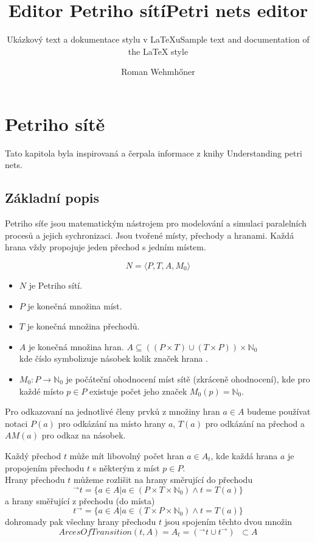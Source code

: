 \documentclass[
  biblatex,
  glossaries,
]{kidiplom}
\title{Editor Petriho sítí}
\title[english]{Petri nets editor}
\subtitle{Ukázkový text a dokumentace stylu v \LaTeX{}u}
\subtitle[english]{Sample text and documentation of the \LaTeX{} style}
\author{Roman Wehmhőner}
\begin{document}
\maketitle

\newcommand{\BibLaTeX}{\textsc{Bib}\LaTeX}
\newcommand{\todo}[1]{\textcolor{red}{TODO: #1}\PackageWarning{TODO:}{#1!}}



\section{Petriho sítě}
Tato kapitola byla inspirovaná a čerpala informace z knihy 
Understanding petri nets\cite{reisig2013understanding}.


\subsection{Základní popis}

Petriho síťe jsou matematickým nástrojem
pro modelování a simulaci paralelních procesů a jejich sychronizaci.
Jsou tvořené místy, přechody a hranami. Každá hrana vždy propojuje
jeden přechod s jedním místem.

\begin{definition}
  $$ N = \langle P,T,A,M_{0}\rangle $$
  \begin{itemize}
    \item $N$ je Petriho sítí.
    \item $P$ je konečná množina míst.
    \item $T$ je konečná množina přechodů.
    \item $A$ je konečná množina hran.
        $ A \subseteq ((P \times T) \cup (T \times P)) \times \mathbb{N}_0 $ \\
        kde číslo symbolizuje násobek kolik značek hrana .
    \item $M_{0} : P \rightarrow \mathbb{N}_0$ je počáteční ohodnocení míst sítě (zkráceně ohodnocení),
        kde pro každé místo $p \in P$ existuje počet jeho značek $M_{0}(p) = \mathbb{N}_0$.
  \end{itemize}
\end{definition}

Pro odkazovaní na jednotlivé členy prvků z množiny hran $a \in A$ 
budeme používat notaci $P(a)$ pro odkázání na místo hrany $a$,
$T(a)$ pro odkázání na přechod a $AM(a)$ pro odkaz na násobek.

Každý přechod $t$ může mít  libovolný počet
hran $a \in A_t$, kde každá hrana $a$ je propojením přechodu $t$ s některým z míst $p \in P$.\\
Hrany přechodu $t$ můžeme rozlišit na hrany směrující do přechodu
$$^\to t = \{a \in A | a \in (P \times T \times \mathbb{N}_0) \land t = T(a)\}$$
a hrany směřující z přechodu (do místa)
$$ t ^\to  = \{a \in A | a \in (T \times P \times \mathbb{N}_0) \land t = T(a)\}$$
dohromady pak všechny hrany přechodu $t$ jsou spojením těchto dvou množin
$$ArcesOfTransition(t,A) = A_t = (^\to t \cup t ^\to)\;\; \subset A$$
\end{document}
